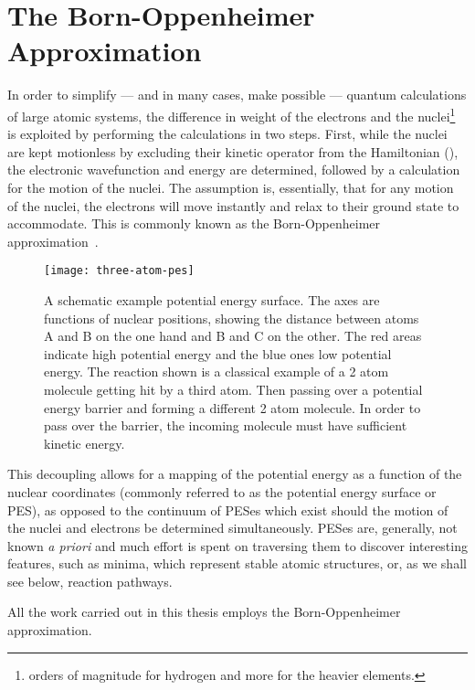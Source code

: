 \section{The Born-Oppenheimer Approximation}
\label{sec:born-oppenheimer}
In order to simplify --- and in many cases, make possible --- quantum calculations of large atomic systems, the difference in weight of the electrons and the nuclei\footnote{ orders of magnitude for hydrogen and more for the heavier elements.} is exploited by performing the calculations in two steps.
First, while the nuclei are kept motionless by excluding their kinetic operator from the Hamiltonian (), the electronic wavefunction and energy are determined, followed by a calculation for the motion of the nuclei.
The assumption is, essentially, that for any motion of the nuclei, the electrons will move instantly and relax to their ground state to accommodate.
This is commonly known as the Born-Oppenheimer approximation~\cite{born-oppenheimer-1927}.

\begin{figure}[h]
  \begin{center}
    \texttt{[image: three-atom-pes]}
\parbox{0.85\linewidth}{
    \caption{
A schematic example potential energy surface.
The axes are functions of nuclear positions, showing the distance between atoms A and B on the one hand and B and C on the other.
The red areas indicate high potential energy and the blue ones low potential energy.
The reaction shown is a classical example of a 2 atom molecule getting hit by a third atom.
Then passing over a potential energy barrier and forming a different 2 atom molecule.
In order to pass over the barrier, the incoming molecule must have sufficient kinetic energy.
}
\label{fig:dimer-force-overview}
}
  \end{center}
\end{figure}

This decoupling allows for a mapping of the potential energy as a function of the nuclear coordinates (commonly referred to as the potential energy surface or PES), as opposed to the continuum of PESes which exist should the motion of the nuclei and electrons be determined simultaneously.
PESes are, generally, not known \textit{a priori} and much effort is spent on traversing them to discover interesting features, such as minima, which represent stable atomic structures, or, as we shall see below, reaction pathways.


All the work carried out in this thesis employs the Born-Oppenheimer approximation.

